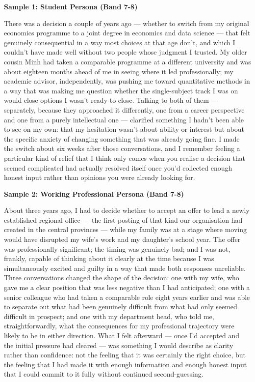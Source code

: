 \begin{ieltsanswer}
\textbf{Sample 1: Student Persona (Band 7-8)}

There was a decision a couple of years ago — whether to switch from my original economics programme to a joint degree in economics and data science — that felt genuinely consequential in a way most choices at that age don't, and which I couldn't have made well without two people whose judgment I trusted. My older cousin Minh had taken a comparable programme at a different university and was about eighteen months ahead of me in seeing where it led professionally; my academic advisor, independently, was pushing me toward quantitative methods in a way that was making me question whether the single-subject track I was on would close options I wasn't ready to close. Talking to both of them — separately, because they approached it differently, one from a career perspective and one from a purely intellectual one — clarified something I hadn't been able to see on my own: that my hesitation wasn't about ability or interest but about the specific anxiety of changing something that was already going fine. I made the switch about six weeks after those conversations, and I remember feeling a particular kind of relief that I think only comes when you realise a decision that seemed complicated had actually resolved itself once you'd collected enough honest input rather than opinions you were already looking for.

\textbf{Sample 2: Working Professional Persona (Band 7-8)}

About three years ago, I had to decide whether to accept an offer to lead a newly established regional office — the first posting of that kind our organisation had created in the central provinces — while my family was at a stage where moving would have disrupted my wife's work and my daughter's school year. The offer was professionally significant; the timing was genuinely bad; and I was not, frankly, capable of thinking about it clearly at the time because I was simultaneously excited and guilty in a way that made both responses unreliable. Three conversations changed the shape of the decision: one with my wife, who gave me a clear position that was less negative than I had anticipated; one with a senior colleague who had taken a comparable role eight years earlier and was able to separate out what had been genuinely difficult from what had only seemed difficult in prospect; and one with my department head, who told me, straightforwardly, what the consequences for my professional trajectory were likely to be in either direction. What I felt afterward — once I'd accepted and the initial pressure had cleared — was something I would describe as clarity rather than confidence: not the feeling that it was certainly the right choice, but the feeling that I had made it with enough information and enough honest input that I could commit to it fully without continued second-guessing.
\end{ieltsanswer}



